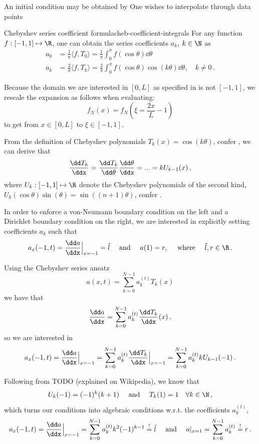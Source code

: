 \documentclass{prettytex/ox/mmsc-special-topic}
\begin{document}
  An initial condition may be obtained by
  One wishes to interpolate through data points

  \begin{theorem}{Chebyshev series coefficient formula}{cheb-coefficient-integrals}
    For any function $f: [-1, 1] \mapsto \R$, one can obtain the \chebyshev series coefficients $a_k$, $k \in \N$ as
    \begin{align*}
      a_0 & = \frac{1}{\pi} \langle f, T_0 \rangle =  \frac{1}{\pi} \int_0^\pi f(\cos \theta) \dd\theta                                   \\
      a_k & = \frac{2}{\pi} \langle f, T_k \rangle = \frac{2}{\pi} \int_0^\pi f(\cos \theta) \cos(k \theta) \dd\theta, \quad k \neq 0 \,.
    \end{align*}
  \end{theorem}

  Because the domain we are interested in $[0, L]$ as specified in  is not $[-1, 1]$, we rescale the expansion as follows when evaluating:
  $$f_N(x) = f_N\left(\xi = \frac{2 x}{L} - 1\right)$$
  to get from $x \in [0, L]$ to $\xi \in [-1, 1]$.

  From the definition of Chebyshev polynomials $T_k(x) = \cos(k\theta)$, confer , we can derive that
  $$\frac{\dd T_k}{\ddx} = \frac{\dd T_k}{\dd\theta} \frac{\dd\theta}{\ddx} = ... = k U_{k-1}(x)\,,$$
  where $U_k: [-1, 1] \mapsto \R$ denote the Chebyshev polynomials of the second kind, $U_k(\cos \theta) \sin(\theta) = \sin\left((n+1) \theta\right)$, confer .

  In order to enforce a von-Neumann boundary condition on the left and a Dirichlet boundary condition on the right,
  we are interested in explicitly setting coefficients $a_k$ such that
  $$a_x(-1, t) = \frac{\dd a}{\ddx}\Big|_{x=-1} = \tilde{l} \quad \text{ and } \quad a(1) = r, \quad \text{ where } \quad \tilde{l}, r \in \R\,.$$

  Using the Chebyshev series ansatz
  $$a(x, t) = \sum_{k=0}^{N-1} a_k^{(t)} T_k(x)$$
  we have that
  $$\frac{\dd a}{\ddx} = \sum_{k=0}^{N-1} a_k^{(t)} \frac{\dd T_k}{\ddx}(x)\,,$$
  so we are interested in
  $$a_x(-1, t) = \frac{\dd a}{\ddx}\Big|_{x=-1} = \sum_{k=0}^{N-1} a_k^{(t)} \frac{\dd T_k}{\ddx}\Big|_{x=-1} = \sum_{k=0}^{N-1} a_k^{(t)} k U_{k-1}(-1)\,.$$

  Following from TODO (explained on Wikipedia), we know that
  $$U_k(-1) = (-1)^k (k+1) \quad \text{ and } \quad T_k(1) = 1 \quad \forall k \in \N\,,$$
  which turns our conditions into algebraic conditions w.r.t. the coefficients $a_k^{(t)}$,
  $$a_x(-1, t) = \frac{\dd a}{\ddx}\Big|_{x=-1} = \sum_{k=0}^{N-1} a_k^{(t)} k^2 (-1)^{k-1} \overset{!}{=} \tilde{l} \quad \text{ and } \quad a|_{x=1} = \sum_{k=0}^{N-1} a_k^{(t)} \overset{!}{=} r\,.$$
\end{document}
